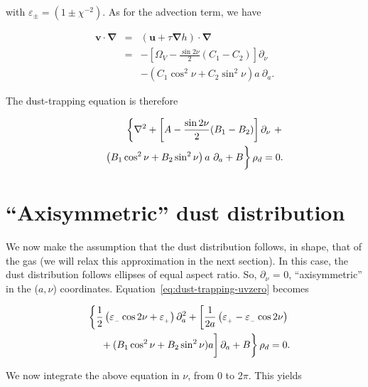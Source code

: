 \documentclass[apj]{emulateapj}
\renewcommand{\v}[1]{{\boldsymbol{#1}}} %
\def\white#1{\textcolor{white}{#1}}
\newcommand{\del}{\v{\nabla}}
\newcommand{\grad}{\del}
\newcommand{\Laplace}{\nabla^2}
\newcommand{\beq}{\begin{equation}}
\newcommand{\eeq}{\end{equation}}
\newcommand{\beqn}{\begin{eqnarray}}
\newcommand{\eeqn}{\end{eqnarray}}
\newcommand{\epsp}{\varepsilon_{_{+}}}
\newcommand{\epsm}{\varepsilon_{_{-}}}
\begin{document}
\noindent with $\varepsilon_{\pm} = (1 \pm \chi^{-2})$.  As for the advection term, we have 

\beqn
\v{v}\cdot\del &=& (\v{u} + \tau \grad h) \cdot \del \nonumber \\
&=& - \left[\varOmega_V - \frac{\sin2\nu}{2}  (C_1 -  C_2)\right]\partial_\nu \nonumber \\
&&- \left( C_1 \cos^2\nu   + C_2\sin^2\nu \right) a \ \partial_a. \label{eq:advection-term}
\eeqn


The dust-trapping equation is therefore 


\beqn 
&& \left\{ \Laplace{} + \left[A - \frac{\sin2\nu}{2}  (B_1 - B_2)\right]\partial_\nu \ +  \right.  \nonumber\\
&& \left. \white{\frac{1}{1}}\left( B_1 \cos^2\nu   + B_2\sin^2\nu
  \right) a \ \partial_a  + B \right\} \rho_d = 0. \label{eq:dust-trapping-uvzero}
\eeqn



\section{``Axisymmetric'' dust distribution}

We now make the assumption that the dust distribution follows, in shape, that of
the gas (we will relax this approximation in the next section). In this case, the
dust distribution follows ellipses of equal aspect ratio. So,
$\partial_\nu$ = 0, ``axisymmetric'' in the ($a,\nu$)
coordinates. Equation~\ref{eq:dust-trapping-uvzero} becomes

\beqn
&&\left\{\frac{1}{2}\left(\epsm \cos 2\nu +\epsp\right) \partial^2_a  +  \left[\frac{1}{2a}\left( \epsp - \epsm\cos 2\nu\right) \right.\right. \nonumber\\
&&\left.\left.\white{\frac{1}{1}}+ (B_1\cos^2\nu +  B_2\sin^2\nu)a\right] \partial_a  + B\right\} \rho_d = 0. 
\eeqn

We now integrate the above equation in $\nu$, from 0 to 2$\pi$. This yields

\end{document}
